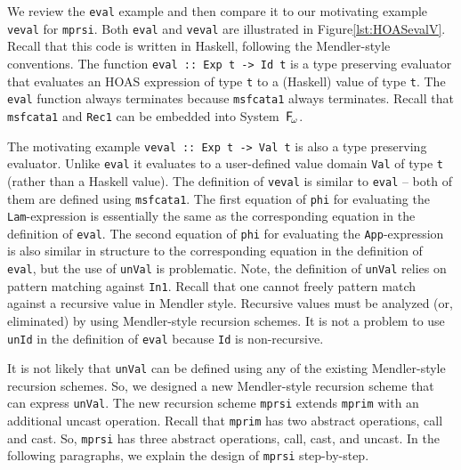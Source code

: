 \documentclass[a4paper,UKenglish]{lipics}
\newcommand{\Fw}[0]{{\ensuremath{\mathsf{\uppercase{F}}_{\!\omega}}}}
\begin{document}
\begin{figure}

\vspace*{-3ex}
\end{figure}

We review the \lstinline{eval} example and then compare
it to our motivating example \lstinline{veval} for \lstinline{mprsi}.
Both \lstinline{eval} and \lstinline{veval} are illustrated
in Figure\;\ref{lst:HOASevalV}. Recall that this code is written in Haskell,
following the Mendler-style conventions.
The function \lstinline{eval :: Exp t -> Id t} is
a type preserving evaluator that evaluates an HOAS expression of type
\lstinline{t} to a (Haskell) value of type \lstinline{t}.
The \lstinline{eval} function always terminates because
\lstinline{msfcata1} always terminates. Recall that \lstinline{msfcata1}
and \lstinline{Rec1} can be embedded into System~\Fw.

The motivating example \lstinline{veval :: Exp t -> Val t} is also 
a type preserving evaluator. Unlike \lstinline{eval} it evaluates to 
a user-defined value domain \lstinline{Val} of type \lstinline{t} (rather
than a Haskell value). The definition of \lstinline{veval} is similar to
\lstinline{eval} -- both of them are defined using \lstinline{msfcata1}.
The first equation of \lstinline{phi} for evaluating
the \lstinline{Lam}-expression is essentially the same as
the corresponding equation in the definition of \lstinline{eval}.
The second equation of \lstinline{phi} for evaluating
the \lstinline{App}-expression is also similar in structure to
the corresponding equation in the definition of \lstinline{eval},
but the use of \lstinline{unVal} is problematic. Note, the definition of
\lstinline{unVal} relies on pattern matching against \lstinline{In1}.
Recall that one cannot freely pattern match against a recursive value
in Mendler style. Recursive values must be analyzed (or, eliminated) by
using Mendler-style recursion schemes. It is not a problem to use
\lstinline{unId} in the definition of \lstinline{eval} because
\lstinline{Id} is non-recursive.

It is not likely that \lstinline{unVal} can be defined using any of
the existing Mendler-style recursion schemes. So, we designed
a new Mendler-style recursion scheme that can express \lstinline{unVal}.
The new recursion scheme \lstinline{mprsi} extends \lstinline{mprim} with
an additional uncast operation. Recall that \lstinline{mprim} has
two abstract operations, call and cast. So, \lstinline{mprsi} has
three abstract operations, call, cast, and uncast. In the following paragraphs,
we explain the design of \lstinline{mprsi} step-by-step.
\end{document}
